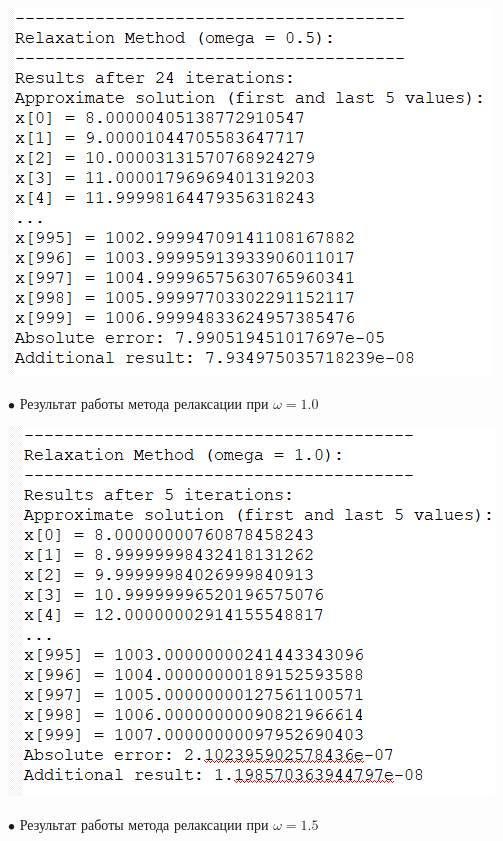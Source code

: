 \documentclass[a4paper, 12pt]{report}
\begin{document}
   \begin{center}
        \includegraphics[scale = 0.7]{pic10.png}
   \end{center}
   $\bullet$ Результат работы метода релаксации при $\omega = 1.0$\\
   \begin{center}
        \includegraphics[scale = 0.7]{pic11.png}
   \end{center}
   $\bullet$ Результат работы метода релаксации при $\omega = 1.5$\\
\end{document}
